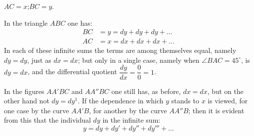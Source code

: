 \documentclass[12pt]{book}
\begin{document}
\begin{center}
\end{center}

\begin{center}
$AC = x$;\quad $BC = y$.
\end{center}

In the triangle $ABC$ one has:
\[
\begin{aligned}
BC &= y = dy + dy + dy + \dots\\
AC &= x = dx + dx + dx + \dots
\end{aligned}
\]
In each of these infinite sums the terms are among themselves equal, namely
$dy = dy$, just as $dx = dx$; but only in a single case, namely when
$\angle BAC = 45^{\circ}$, is $dy = dx$, and the differential quotient
$\dfrac{dy}{dx} = \dfrac{0}{0} = 1$.

In the figures $AA'BC$ and $AA''BC$ one still has, as before, $dx = dx$, but on the
other hand not $dy = dy^{1}$. If the dependence in which $y$ stands to $x$ is viewed,
for one case by the curve $AA'B$, for another by the curve $AA''B$; then it is evident
from this that the individual $dy$ in the infinite sum:
\[
y = dy + dy' + dy'' + dy''' + \dots
\]
\end{document}
